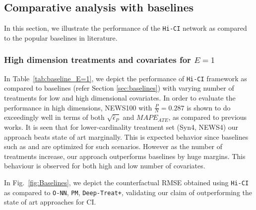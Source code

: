 \documentclass[twoside,11pt]{article}
\begin{document}
\subsection{Comparative analysis with baselines}
In this section, we illustrate the performance of the \texttt{Hi-CI} network as compared to the popular baselines in literature. 

\subsubsection{High dimension treatments and covariates for $E=1$}
In Table~\ref{tab:baseline_E=1}, we depict the performance of \texttt{Hi-CI} framework as compared to baselines (refer Section \ref{sec:baselines}) with varying number of treatments for low and high dimensional covariates. In order to evaluate the performance in high dimensions, \textsf{NEWS100} with $\frac{P}{N} = 0.287$ is shown to do exceedingly well in terms of both $\sqrt{\hat\epsilon_{P}}$ and $MAPE_{ATE}$, as compared to previous works. It is seen that for lower-cardinality treatment set (\textsf{Syn4, NEWS4}) our approach beats state of art marginally. This is expected behavior since baselines such as \citep{esann-multiMBNN} and \citep{schwab2018perfect} are optimized for such scenarios. However as the number of treatments increase, our approach outperforms baselines by huge margins. This behaviour is observed for both high and low number of covariates.

In Fig.~\ref{fig:Baselines}, we depict the counterfactual RMSE obtained using \texttt{Hi-CI} as compared to \texttt{O-NN}, \texttt{PM}, \texttt{Deep-Treat+}, validating our claim of outperforming the state of art approaches for CI.
\end{document}
